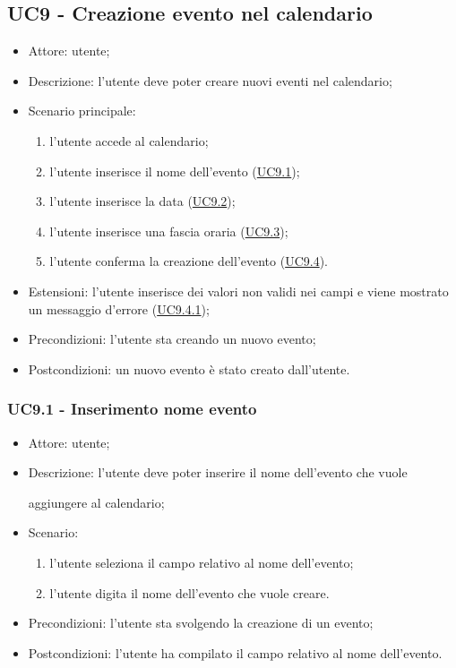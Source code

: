 

\subsection{UC9 - Creazione evento nel calendario}
\begin{itemize}
    \item Attore: utente;
    \item Descrizione: l'utente deve poter creare nuovi eventi nel calendario;
    \item Scenario principale:
        \begin{enumerate}
        \item l'utente accede al calendario;
        \item l'utente inserisce il nome dell'evento (\hyperref[sec: UC9.1]{UC9.1});
        \item l'utente inserisce la data (\hyperref[sec: UC9.2]{UC9.2});
        \item l'utente inserisce una fascia oraria (\hyperref[sec: UC9.3]{UC9.3});
        \item l'utente conferma la creazione dell'evento (\hyperref[sec: UC9.4]{UC9.4}).
        \end{enumerate}
    \item Estensioni: l'utente inserisce dei valori non validi nei campi e viene mostrato un messaggio d'errore (\hyperref[sec: UC9.4.1]{UC9.4.1});
    \item Precondizioni: l'utente sta creando un nuovo evento;
    \item Postcondizioni: un nuovo evento è stato creato dall'utente.
\end{itemize}

\subsubsection{UC9.1 - Inserimento nome evento} \label{sec: UC9.1}
\begin{itemize}
    \item Attore: utente;
    \item Descrizione: l'utente deve poter inserire il nome dell'evento che vuole \par aggiungere al calendario;
    \item Scenario:
        \begin{enumerate}
        \item l'utente seleziona il campo relativo al nome dell'evento;
        \item l'utente digita il nome dell'evento che vuole creare.
        \end{enumerate}
    
    \item Precondizioni: l'utente sta svolgendo la creazione di un evento;
    \item Postcondizioni: l'utente ha compilato il campo relativo al nome dell'evento.
\end{itemize}


